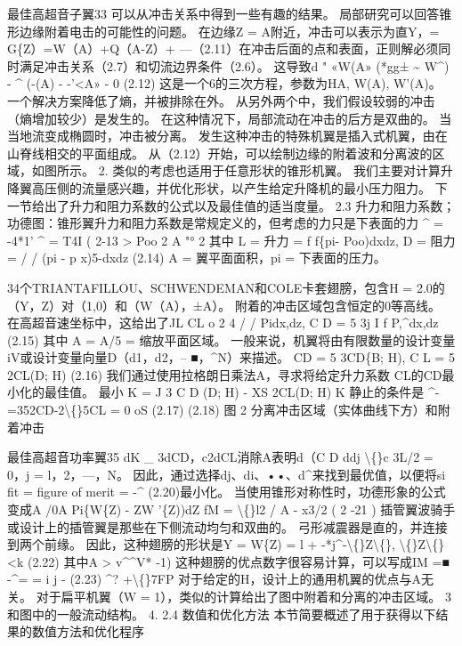 \documentclass[UTF8,11pt,a4paper,openany,fontset=fandol]{ctexbook}
\begin{document}
最佳高超音子翼33 可以从冲击关系中得到一些有趣的结果。 局部研究可以回答锥形边缘附着电击的可能性的问题。 在边缘Z = A附近，冲击可以表示为直Y，= G\{Z）=W（A）+Q（A-Z）+ ---（2.11）在冲击后面的点和表面，正则解必须同时满足冲击关系（2.7）和切流边界条件（2.6）。 这导致d " «W(A» (*gg± \textasciitilde{} W\textasciicircum{}) - \textasciicircum{} (-(A) - -'<A» - 0 (2.12) 这是一个6的三次方程，参数为HA, W(A), W'(A)。 一个解决方案降低了熵，并被排除在外。 从另外两个中，我们假设较弱的冲击（熵增加较少）是发生的。 在这种情况下，局部流动在冲击的后方是双曲的。 当当地流变成椭圆时，冲击被分离。 发生这种冲击的特殊机翼是插入式机翼，由在山脊线相交的平面组成。 从（2.12）开始，可以绘制边缘的附着波和分离波的区域，如图所示。 2. 类似的考虑也适用于任意形状的锥形机翼。 我们主要对计算升降翼高压侧的流量感兴趣，并优化形状，以产生给定升降机的最小压力阻力。 下一节给出了升力和阻力系数的公式以及最佳值的适当度量。 2.3 升力和阻力系数；功德图：锥形翼升力和阻力系数是常规定义的，但考虑的力只是下表面的力 \textasciicircum{} = -4*1' \textasciicircum{} = T4I ( 2-13 > Poo 2 A "° 2 其中 L = 升力 = f f\{pi- Poo)dxdz, D = 阻力 = / / (pi - p x)5-dxdz (2.14) A = 翼平面面积，pi = 下表面的压力。

34个TRIANTAFILLOU、SCHWENDEMAN和COLE卡套翅膀，包含H = 2.0的（Y，Z）对（1,0）和（W（A），±A）。 附着的冲击区域包含恒定的0等高线。 在高超音速坐标中，这给出了JL CL o 2 4 / / Pidx,dz, C D = 5 3j I f P,\textasciicircum{}dx,dz (2.15) 其中 A = A/5 = 缩放平面区域。 一般来说，机翼将由有限数量的设计变量iV或设计变量向量D（d1，d2，-- ■，\textasciicircum{}N）来描述。 CD = 5 3CD\{B; H), C L = 5 2CL(D; H) (2.16) 我们通过使用拉格朗日乘法A，寻求将给定升力系数 CL的CD最小化的最佳值。 最小 K = J 3 C D (D; H) - XS 2CL(D; H) K 静止的条件是 \textasciicircum{}-=352CD-2\textbackslash\{\}5CL = 0 oS (2.17) (2.18) 图 2 分离冲击区域（实体曲线下方）和附着冲击

最佳高超音功率翼35 dK \_ 3dCD，c2dCL消除A表明d（C D ddj \textbackslash\{\}c 3L/2 = 0，j = l，2，---，N。 因此，通过选择dj、di、••、d\textasciicircum{}来找到最优值，以便将si fit = figure of merit = -\textasciicircum{} (2.20)最小化。 当使用锥形对称性时，功德形象的公式变成A /0A Pi\{W\{Z) - ZW '\{Z))dZ fM = \textbackslash\{\}l2 / A - x3/2 ( 2 -21 ) 插管翼波骑手或设计上的插管翼是那些在下侧流动均匀和双曲的。 弓形减震器是直的，并连接到两个前缘。 因此，这种翅膀的形状是Y = W\{Z) = l + -*j\textasciicircum{}-\textbackslash\{\}Z\textbackslash\{\}, \textbackslash\{\}Z\textbackslash\{\}<k (2.22) 其中A > v\textasciicircum{}\textasciicircum{}V* -1) 这种翅膀的优点数字很容易计算，可以写成IM =■ -\textasciicircum{}= = i j - (2.23) \textasciicircum{}? +\textbackslash\{\}7FP 对于给定的H，设计上的通用机翼的优点与A无关。 对于扁平机翼（W = 1），类似的计算给出了图中附着和分离的冲击区域。 3和图中的一般流动结构。 4. 2.4 数值和优化方法 本节简要概述了用于获得以下结果的数值方法和优化程序
\end{document}
